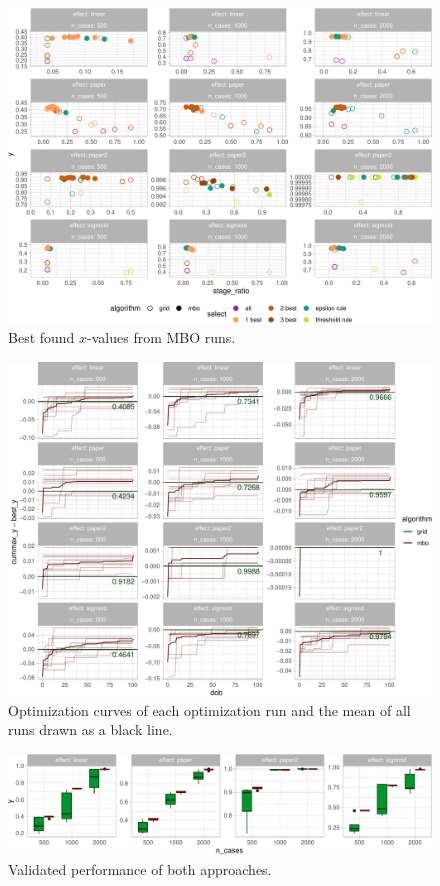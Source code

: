 \documentclass[bimj,fleqn]{w-art}
\theoremstyle{plain}
\theoremstyle{definition}
\begin{document}
\begin{figure}[htb]
\centering
\includegraphics[width=\linewidth]{generated/figures/plot_best_x.pdf}
\caption{Best found $x$-values from MBO runs.}
\label{fig:plot_best_x}
\end{figure}


\begin{figure}[htb]
\centering
\includegraphics[width=\linewidth]{generated/figures/plot_opt_path.pdf}
\caption{%
  Optimization curves of each optimization run and the mean of all runs drawn as a black line.
  }
\label{fig:plot_opt_path} 
\end{figure}

\begin{figure}[htb]
\centering
\includegraphics[width=\linewidth]{generated/figures/plot_boxplot_valid_y.pdf}
\caption{%
  Validated performance of both approaches.
  }
\label{fig:plot_boxplot_valid_y}
\end{figure}
\end{document}
